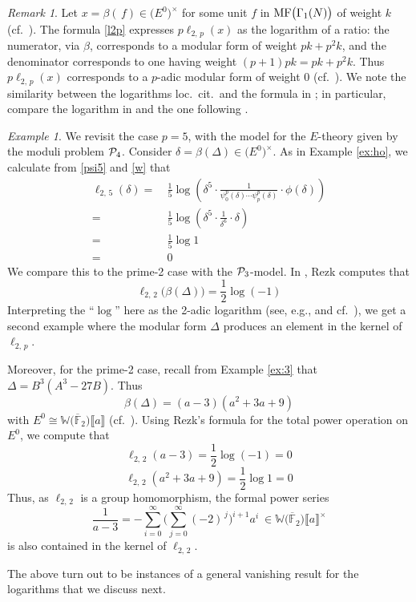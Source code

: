 \documentclass{gtpart}
\theoremstyle{definition}
\theoremstyle{remark}
\newtheorem{rmk}[thm]{Remark}
\newtheorem{ex}[thm]{Example}
\newcommand{\mb}[1]{\mathbb{#1}}
\newcommand{\cF}{\overline {\mb F}}
\newcommand{\CP}{{\cal P}}
\newcommand{\BW}{{\mb W}}
\newcommand{\MF}{{\rm MF}}
\newcommand{\B}{\beta}
\renewcommand{\D}{\Delta}
\renewcommand{\d}{\delta}
\newcommand{\G}{\Gamma}
\newcommand{\lb}{\llbracket}
\newcommand{\rb}{\rrbracket}
\renewcommand{\=}{\approx}
\renewcommand{\-}{\sim}
\numberwithin{equation}{section}
\numberwithin{thm}{section}
\begin{document}
\begin{rmk}
 \label{rmk:ratio}
 Let $x = \B(\,f) \in \big( E^0 \big)^{\!\times}$ for some unit 
 $f$ in $\MF\big(\G_1(N)\big)$ of weight $k$ (cf.~\cite{KubertLang}).  
 The formula \eqref{l2p} expresses $p \ell_{2,\,p}(x)$ as the logarithm of a ratio: 
 the numerator, via $\B$, corresponds to a modular form of weight $p k + p^2 k$, 
 and the denominator corresponds to one having weight $(p + 1) p k = p k + p^2 k$.  
 Thus $p \ell_{2,\,p}(x)$ corresponds to a $p$-adic modular form of weight 0 (cf.~\cite[Section 10.1]{padicinterp}).  
 We note the similarity between the logarithms loc.~cit.~and the formula in \cite[Theorem 1.11]{log}; 
 in particular, compare the logarithm in \cite[10.2.7]{padicinterp} and the one following \cite[Theorem 1.9]{log}.  
\end{rmk}

\begin{ex}
 \label{ex:log}
 We revisit the case $p = 5$, with the model for the $E$-theory given by the moduli problem $\CP_4$.  
 Consider $\d = \B(\D) \in \big( E^0 \big)^{\!\times}$.  
 As in Example \ref{ex:ho}, we calculate from \eqref{psi5} and \eqref{w} that 
 \begin{equation*}
  \begin{split}
   \ell_{2,\,5}(\d) = & ~ \frac{1}{5} \log \left( \d^5 \cdot \frac{1}{\psi^p_0(\d) \cdots \psi^p_p(\d)} \cdot \phi(\d) \right) \\
                  = & ~ \frac{1}{5} \log \left( \d^5 \cdot \frac{1}{\d^6} \cdot \d \right) \\
                  = & ~ \frac{1}{5} \log 1 \\
                  = & ~ 0 
  \end{split}
 \end{equation*}
 We compare this to the prime-2 case with the $\CP_3$-model.  
 In \cite[2.8]{h2p2}, Rezk computes that 
 \[
  \ell_{2,\,2}\big(\B(\D)\big) = \frac{1}{2} \log(-1) 
 \]
 Interpreting the ``$\log$'' here as the 2-adic logarithm (see, e.g., \cite[\S IV.1]{padic} and cf.~\cite[10.2.16]{padicinterp}), 
 we get a second example where the modular form $\D$ produces an element in the kernel of $\ell_{2,\,p}$.  

 Moreover, for the prime-2 case, recall from Example \ref{ex:3} that $\D = B^3 (A^3 - 27 B)$.  
 Thus 
 \[
  \B(\D) = (a - 3) (a^2 + 3 a + 9) 
 \]
 with $E^0 \cong \BW \big( \cF_2 \big) \lb a \rb$ (cf.~\cite[Section 4]{h2p2}).  
 Using Rezk's formula for the total power operation on $E^0$, we compute that 
 \[
  \ell_{2,\,2}(a - 3) = \frac{1}{2} \log(-1) = 0 
 \]
 \[
  \ell_{2,\,2}(a^2 + 3 a + 9) = \frac{1}{2} \log 1 = 0 
 \]
 Thus, as $\ell_{2,\,2}$ is a group homomorphism, the formal power series 
 \[
  \frac{1}{a - 3} = -\sum_{i = 0}^\infty \Big( \sum_{j = 0}^\infty (-2)^{\,j} \Big)^{\!i + 1} a^i ~ \in \BW \big( \cF_2 \big) \lb a \rb^\times 
 \]
 is also contained in the kernel of $\ell_{2,\,2}$.  

 The above turn out to be instances of a general vanishing result for the logarithms that we discuss next.  
\end{ex}
\end{document}
